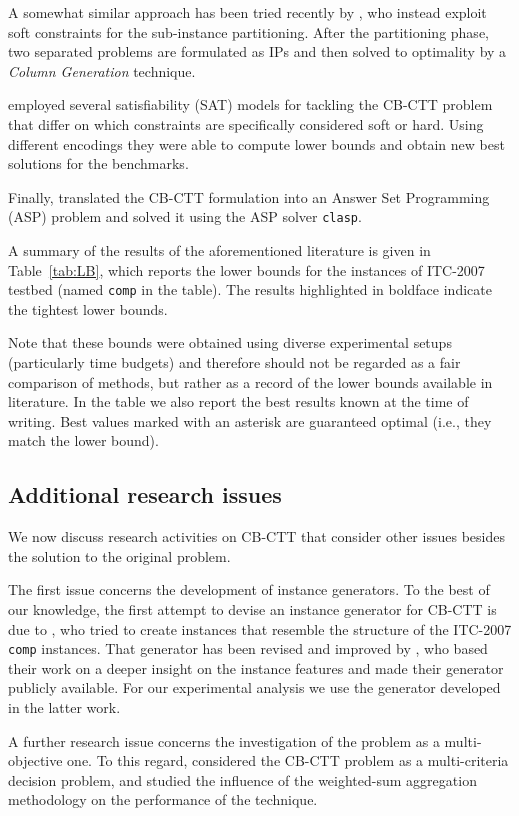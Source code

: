 \documentclass[authoryear,12pt]{article}
\newcommand{\cbctt}{CB-CTT}
\begin{document}
A somewhat similar approach has been tried recently by \citet{CCRT13}, who
instead exploit soft constraints for the sub-instance partitioning. After the
partitioning phase, two separated problems are formulated as IPs and then solved
to optimality by a \emph{Column Generation} technique.

\citet{AsNi14} employed several satisfiability (SAT) models for tackling the
\cbctt{} problem that differ on which constraints are specifically considered
soft or hard. Using different encodings they were able to compute lower bounds
and obtain new best solutions for the benchmarks.

Finally, \citet{MSTIS13} translated the \cbctt{} formulation into an Answer Set
Programming (ASP) problem and solved it using the ASP solver \texttt{clasp}.

A summary of the results of the aforementioned literature is given in
Table~\ref{tab:LB}, which reports the lower bounds for the instances of ITC-2007
testbed (named \texttt{comp} in the table). The results highlighted in boldface
indicate the tightest lower bounds.

Note that these bounds were obtained using diverse experimental setups
(particularly time budgets) and therefore should not be regarded as a fair
comparison of methods, but rather as a record of the lower bounds available in
literature. In the table we also report the best results known at the time of
writing. Best values marked with an asterisk are guaranteed optimal (i.e., they
match the lower bound).

\subsection{Additional research issues}

We now discuss research activities on \cbctt{} that consider other issues
besides the solution to the original problem.

The first issue concerns the development of instance generators. To the best of
our knowledge, the first attempt to devise an instance generator for \cbctt{} is
due to \citet{BMPR10}, who tried to create instances that resemble the structure
of the ITC-2007 \texttt{comp} instances. That generator has been revised and
improved by \citet{LoMi10}, who based their work on a deeper insight on the
instance features and made their generator publicly available. For our
experimental analysis we use the generator developed in the latter work.

A further research issue concerns the investigation of the problem as a
multi-objective one.  To this regard, \citet{Geig09} considered the \cbctt{}
problem as a multi-criteria decision problem, and studied the influence of the
weighted-sum aggregation methodology on the performance of the technique.
\end{document}
